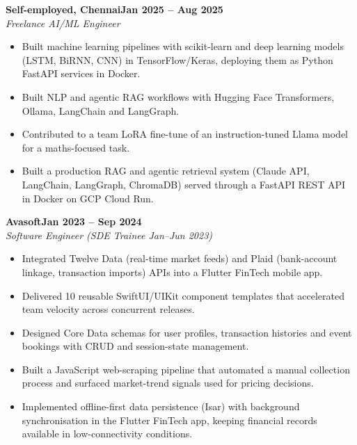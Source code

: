 \documentclass[a4paper,11pt]{article}
\newcommand{\entry}[4]{\needspace{4\baselineskip}\noindent\textbf{#1}\hfill\textbf{#2}\\ \textit{#3}\hfill\textit{#4}\par}
\begin{document}
\vspace{4pt}
\entry{Self-employed, Chennai}{Jan 2025 – Aug 2025}{Freelance AI/ML Engineer}{}
\begin{itemize}
  \item Built machine learning pipelines with scikit-learn and deep learning models (LSTM, BiRNN, CNN) in TensorFlow/Keras, deploying them as Python FastAPI services in Docker.
  \item Built NLP and agentic RAG workflows with Hugging Face Transformers, Ollama, LangChain and LangGraph.
  \item Contributed to a team LoRA fine-tune of an instruction-tuned Llama model for a maths-focused task.
  \item Built a production RAG and agentic retrieval system (Claude API, LangChain, LangGraph, ChromaDB) served through a FastAPI REST API in Docker on GCP Cloud Run.
\end{itemize}
\vspace{4pt}
\entry{Avasoft}{Jan 2023 – Sep 2024}{Software Engineer (SDE Trainee Jan–Jun 2023)}{}
\begin{itemize}
  \item Integrated Twelve Data (real-time market feeds) and Plaid (bank-account linkage, transaction imports) APIs into a Flutter FinTech mobile app.
  \item Delivered 10 reusable SwiftUI/UIKit component templates that accelerated team velocity across concurrent releases.
  \item Designed Core Data schemas for user profiles, transaction histories and event bookings with CRUD and session-state management.
  \item Built a JavaScript web-scraping pipeline that automated a manual collection process and surfaced market-trend signals used for pricing decisions.
  \item Implemented offline-first data persistence (Isar) with background synchronisation in the Flutter FinTech app, keeping financial records available in low-connectivity conditions.
\end{itemize}

\end{document}
